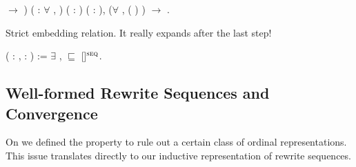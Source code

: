 \begin{singlespace}
\begin{coqdoccode}
\ensuremath{\rightarrow} )
( : \ensuremath{\forall} ,
 )\coqdoceol
\coqdocindent{5.00em}
( :
 
) (\coqdocvar{$\psi$} : 
),\coqdoceol
\coqdocindent{9.50em}
(\ensuremath{\forall} , ( )
 \coqdocvariable{$\psi$})
\ensuremath{\rightarrow}\coqdoceol
\coqdocindent{9.50em}
 
 
\coqdocvariable{$\psi$}.\coqdoceol
\end{coqdoccode}
\end{singlespace}

Strict embedding relation. It really expands after the last step!
\begin{singlespace}
\begin{coqdoccode}
\coqdocnoindent
{}
   
(\coqdocvar{$\varphi$} : 
,
\coqdocvar{$\psi$} :
) := \ensuremath{\exists} \coqdocvar{$\iota$},
\coqdocvariable{$\varphi$} $\sqsubseteq$
\coqdocvariable{$\psi$}[\coqdocvariable{$\iota$}]$^\textsc{seq}$.\coqdoceol
\end{coqdoccode}
\end{singlespace}


\subsection{Well-formed Rewrite Sequences and Convergence}\label{sub:wf}

On  we defined the
 property to rule out a certain
class of ordinal representations. This issue translates directly to our
inductive representation of rewrite sequences.

